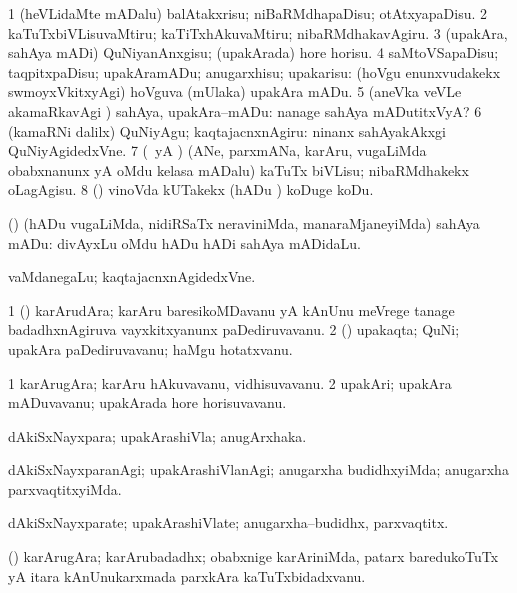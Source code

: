 \bentry
{}
\gl{\sakirx}
\bmng
% 
\bnum
\num{1} (heVLidaMte mADalu) balAtakxrisu; niBaRMdhapaDisu; otAtxyapaDisu. 
\num{2} kaTuTxbiVLisuvaMtiru; kaTiTxhAkuvaMtiru; nibaRMdhakavAgiru. 
\num{3} (upakAra, sahAya mADi) QuNiyanAnxgisu; (upakArada) hore horisu. 
\num{4} saMtoVSapaDisu; taqpitxpaDisu; upakAramADu; anugarxhisu; upakarisu:  (hoVgu enunxvudakekx swmoyxVkitxyAgi) hoVguva (mUlaka) upakAra mADu. 
\num{5} (aneVka veVLe akamaRkavAgi \parx) sahAya, upakAra--mADu:  nanage sahAya mADutitxVyA? 
\num{6} (kamaRNi \parx dalilx) QuNiyAgu; kaqtajacnxnAgiru:  ninanx sahAyakAkxgi QuNiyAgidedxVne. 
\num{7} (\pArxparx\ yA \nAyxshA) (ANe, parxmANa, karAru, \mo vugaLiMda obabxnanunx yA oMdu kelasa mADalu) kaTuTx biVLisu; nibaRMdhakekx oLagAgisu. 
\num{8} (\AmA) vinoVda kUTakekx (hADu \mo) koDuge koDu. 
\enum
\emng

\noindent
\gl{\akirx}
\bmng
(\AmA) (hADu \mo vugaLiMda, nidiRSaTx neraviniMda, manaraMjaneyiMda) sahAya mADu:  divAyxLu oMdu hADu hADi sahAya mADidaLu. 
\emng

\noindent
\gl{\pagu}
\bmng
{}  vaMdanegaLu; kaqtajacnxnAgidedxVne. 
\emng
\eentry

\bentry
{}
\gl{\nA}
\bmng
\bnum
\num{1} (\nAyxshA) karArudAra; karAru baresikoMDavanu yA kAnUnu meVrege tanage badadhxnAgiruva vayxkitxyanunx paDediruvavanu. 
\num{2} (\viparx) upakaqta; QuNi; upakAra paDediruvavanu; haMgu hotatxvanu. 
\enum
\emng
\eentry

\bentry
{}
\gl{\nA}
\bmng
\bnum
\num{1} karArugAra; karAru hAkuvavanu, vidhisuvavanu. 
\num{2} upakAri; upakAra mADuvavanu; upakArada hore horisuvavanu. 
\enum
\emng
\eentry

\bentry
{}
\gl{\gu}
\bmng
dAkiSxNayxpara; upakArashiVla; anugArxhaka. 
\emng
\eentry

\bentry
{}
\gl{\kirxvi}
\bmng
dAkiSxNayxparanAgi; upakArashiVlanAgi; anugarxha budidhxyiMda; anugarxha parxvaqtitxyiMda. 
\emng
\eentry

\bentry
{}
\gl{\nA}
\bmng
dAkiSxNayxparate; upakArashiVlate; anugarxha--budidhx, parxvaqtitx. 
\emng
\eentry

\bentry
{}
\gl{\nA}
\bmng
(\nAyxshA) karArugAra; karArubadadhx; obabxnige karAriniMda, patarx baredukoTuTx yA itara kAnUnukarxmada parxkAra kaTuTxbidadxvanu. 
\emng
\eentry

